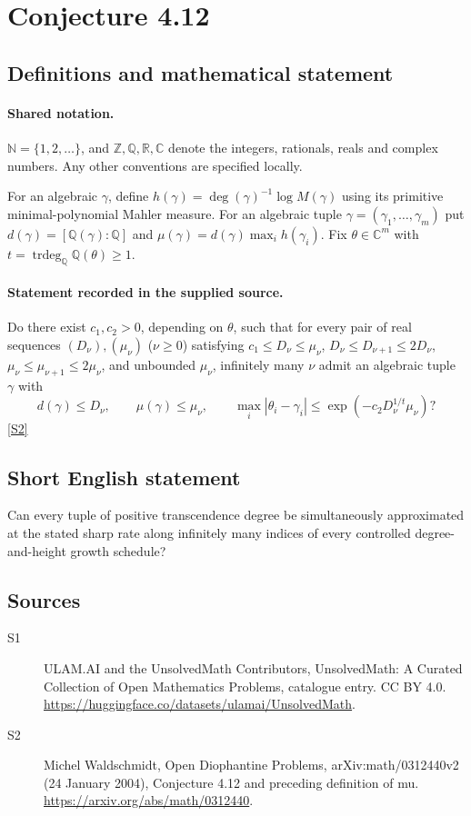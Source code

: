 \documentclass[11pt]{article}
\newcommand{\sref}[2]{\hyperlink{source:#1:#2}{[S#2]}}
\begin{document}
\section{Conjecture 4.12}\label{statement}

\subsection{Definitions and mathematical statement}

\paragraph{Shared notation.}$\mathbb N=\{1,2,\ldots\}$, and $\mathbb Z,\mathbb Q,\mathbb R,\mathbb C$ denote the integers, rationals, reals and complex numbers. Any other conventions are specified locally.


For an algebraic $\gamma$, define $h(\gamma)=\deg(\gamma)^{-1}\log M(\gamma)$ using its primitive minimal-polynomial Mahler measure. For an algebraic tuple $\gamma=(\gamma_1,\ldots,\gamma_m)$ put $d(\gamma)=[\mathbb Q(\gamma):\mathbb Q]$ and $\mu(\gamma)=d(\gamma)\max_i h(\gamma_i)$. Fix $\theta\in\mathbb C^m$ with $t=\operatorname{trdeg}_{\mathbb Q}\mathbb Q(\theta)\ge1$.
\paragraph{Statement recorded in the supplied source.}
Do there exist $c_1,c_2>0$, depending on $\theta$, such that for every pair of real sequences $(D_\nu),(\mu_\nu)$ ($\nu\ge0$) satisfying $c_1\le D_\nu\le\mu_\nu$, $D_\nu\le D_{\nu+1}\le2D_\nu$, $\mu_\nu\le\mu_{\nu+1}\le2\mu_\nu$, and unbounded $\mu_\nu$, infinitely many $\nu$ admit an algebraic tuple $\gamma$ with \[d(\gamma)\le D_\nu,\qquad \mu(\gamma)\le\mu_\nu,\qquad \max_i|\theta_i-\gamma_i|\le\exp(-c_2D_\nu^{1/t}\mu_\nu)?\] \sref{statement}{2}
\subsection{Short English statement}
Can every tuple of positive transcendence degree be simultaneously approximated at the stated sharp rate along infinitely many indices of every controlled degree-and-height growth schedule?
\subsection{Sources}
\begin{description}
\item[\hypertarget{source:statement:1}{S1}] ULAM.AI and the UnsolvedMath Contributors, UnsolvedMath: A Curated Collection of Open Mathematics Problems, catalogue entry. CC BY 4.0. \url{https://huggingface.co/datasets/ulamai/UnsolvedMath}.
\item[\hypertarget{source:statement:2}{S2}] Michel Waldschmidt, Open Diophantine Problems, arXiv:math/0312440v2 (24 January 2004), Conjecture 4.12 and preceding definition of mu. \url{https://arxiv.org/abs/math/0312440}.
\end{description}
\label{end:statement}
\end{document}
